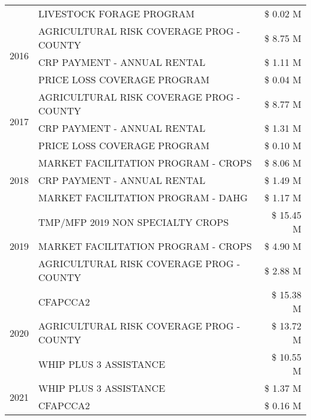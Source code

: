 \begin{tabular}{llr}
 & LIVESTOCK FORAGE PROGRAM & \$ 0.02 M \\
\cline{1-3}
\multirow[t]{3}{*}{2016} & AGRICULTURAL RISK COVERAGE PROG - COUNTY & \$ 8.75 M \\
 & CRP PAYMENT - ANNUAL RENTAL & \$ 1.11 M \\
 & PRICE LOSS COVERAGE PROGRAM & \$ 0.04 M \\
\cline{1-3}
\multirow[t]{3}{*}{2017} & AGRICULTURAL RISK COVERAGE PROG - COUNTY & \$ 8.77 M \\
 & CRP PAYMENT - ANNUAL RENTAL & \$ 1.31 M \\
 & PRICE LOSS COVERAGE PROGRAM & \$ 0.10 M \\
\cline{1-3}
\multirow[t]{3}{*}{2018} & MARKET FACILITATION PROGRAM - CROPS & \$ 8.06 M \\
 & CRP PAYMENT - ANNUAL RENTAL & \$ 1.49 M \\
 & MARKET FACILITATION PROGRAM - DAHG & \$ 1.17 M \\
\cline{1-3}
\multirow[t]{3}{*}{2019} & TMP/MFP 2019 NON SPECIALTY CROPS & \$ 15.45 M \\
 & MARKET FACILITATION PROGRAM - CROPS & \$ 4.90 M \\
 & AGRICULTURAL RISK COVERAGE PROG - COUNTY & \$ 2.88 M \\
\cline{1-3}
\multirow[t]{3}{*}{2020} & CFAPCCA2 & \$ 15.38 M \\
 & AGRICULTURAL RISK COVERAGE PROG - COUNTY & \$ 13.72 M \\
 & WHIP PLUS 3 ASSISTANCE & \$ 10.55 M \\
\cline{1-3}
\multirow[t]{2}{*}{2021} & WHIP PLUS 3 ASSISTANCE & \$ 1.37 M \\
 & CFAPCCA2 & \$ 0.16 M \\
\cline{1-3}
\bottomrule
\end{tabular}
